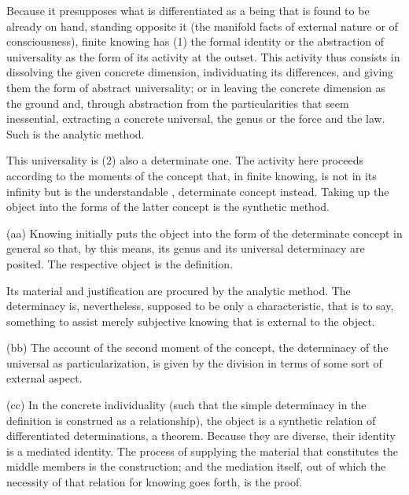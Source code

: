 Because it presupposes what is differentiated as a being that is
found to be already on hand, standing opposite it
(the manifold facts of external nature or of consciousness),
finite knowing has (1) the formal identity or
the abstraction of universality as the form of its activity at the outset.
This activity thus consists in dissolving the given concrete dimension,
individuating its differences, and giving them the form of abstract universality;
or in leaving the concrete dimension as the ground and,
through abstraction from the particularities that seem inessential,
extracting a concrete universal, the genus or the force and the law.
Such is the analytic method.

This universality is (2) also a determinate one.
The activity here proceeds according to the moments of
the concept that, in finite knowing, is not in its infinity
but is the understandable , determinate concept instead.
Taking up the object into the forms of
the latter concept is the synthetic method.

(aa) Knowing initially puts the object into the form of
the determinate concept in general so that, by this means,
its genus and its universal determinacy are posited.
The respective object is the definition.

Its material and justification are procured by the analytic method.
The determinacy is, nevertheless, supposed to be only a characteristic,
that is to say, something to assist merely subjective knowing
that is external to the object.

(bb) The account of the second moment of the concept,
the determinacy of the universal as particularization,
is given by the division in terms of some sort of external aspect.

(cc) In the concrete individuality (such that the simple determinacy in
the definition is construed as a relationship),
the object is a synthetic relation of differentiated determinations, a theorem.
Because they are diverse, their identity is a mediated identity.
The process of supplying the material that constitutes
the middle members is the construction;
and the mediation itself, out of which the necessity of
that relation for knowing goes forth, is the proof.

